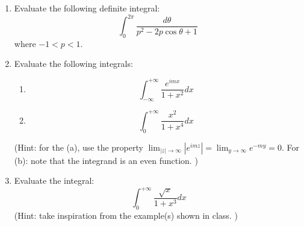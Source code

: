 \documentclass[fleqn]{article}
\begin{document}
  \begin{enumerate}
    \item Evaluate the following definite integral: 
    $$ \int^{2\pi}_0 \frac{d\theta}{p^2 -2p \cos\theta+1}~
    $$ 
    where $-1<p<1$. 
    
    
    \item Evaluate the following integrals:
    \begin{enumerate}
      \item $$ \int^{+\infty}_{-\infty} \frac{ e^{imx}}{1+x^2}dx $$ 
      \item $$ \int^{+\infty}_{0} \frac{ x^2}{1+x^4}dx $$ 
    \end{enumerate}
    (Hint: for the (a), use the property $\displaystyle\lim_{|z|  \to \infty} |e^{im z}| = \displaystyle\lim_{y  \to \infty} e^{-m y} = 0 $.  For (b): note that the integrand is an even function. ) 
    
    \item Evaluate the integral:
    $$\int^{+\infty}_{0} \frac{ \sqrt{x}}{1+x^3}dx$$
    (Hint: take inspiration from the example(s) shown in class. ) 
    
  \end{enumerate}
\end{document}
